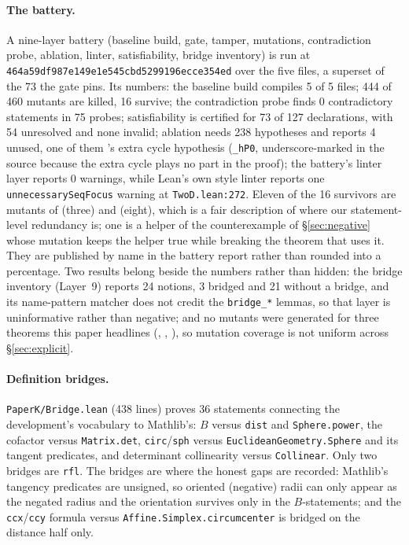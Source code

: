 \documentclass[11pt]{article}
\theoremstyle{definition}
\theoremstyle{remark}
\newcommand{\pkcommit}{464a59df987e149e1e545cbd5299196ecce354ed}
\begin{document}
\paragraph{The battery.} A nine-layer battery (baseline build, gate, tamper, mutations,
contradiction probe, ablation, linter, satisfiability, bridge inventory) is run at \texttt{\pkcommit}
over the five files, a superset of the 73 the gate pins. Its numbers: the baseline build compiles 5
of 5 files; 444 of 460 mutants are killed, 16 survive; the contradiction probe finds 0 contradictory
statements in 75 probes; satisfiability is certified for 73 of 127 declarations, with 54 unresolved
and none invalid; ablation needs 238 hypotheses and reports 4 unused, one of them
's extra cycle hypothesis (\texttt{\_hP0}, underscore-marked in the source
because the extra cycle plays no part in the proof); the battery's linter layer reports 0 warnings,
while Lean's own style linter reports one \texttt{unnecessarySeqFocus} warning at
\texttt{TwoD.lean:272}. Eleven of the 16 survivors are mutants of
 (three) and  (eight),
which is a fair description of where our statement-level redundancy is; one is a helper of the
counterexample of \S\ref{sec:negative} whose mutation keeps the helper true while breaking the
theorem that uses it. They are published by name in the battery report rather than rounded into a
percentage. Two results belong beside the numbers rather than hidden: the bridge inventory
(Layer~9) reports 24 notions, 3 bridged and 21 without a bridge, and its name-pattern matcher does
not credit the \texttt{bridge\_*} lemmas, so that layer is uninformative rather than negative; and no
mutants were generated for three theorems this paper headlines
(, ,
), so mutation coverage is not uniform across \S\ref{sec:explicit}.

\paragraph{Definition bridges.} \texttt{PaperK/Bridge.lean} (438 lines) proves 36 statements
connecting the development's vocabulary to Mathlib's: $B$ versus \texttt{dist} and
\texttt{Sphere.power}, the cofactor versus \texttt{Matrix.det}, \texttt{circ}/\texttt{sph} versus
\texttt{EuclideanGeometry.Sphere} and its tangent predicates, and determinant collinearity versus
\texttt{Collinear}. Only two bridges are \texttt{rfl}. The bridges are where the honest gaps are
recorded: Mathlib's tangency predicates are unsigned, so oriented (negative) radii can only appear as
the negated radius and the orientation survives only in the $B$-statements; and the
\texttt{ccx}/\texttt{ccy} formula versus \texttt{Affine.Simplex.circumcenter} is bridged on the
distance half only.
\end{document}
